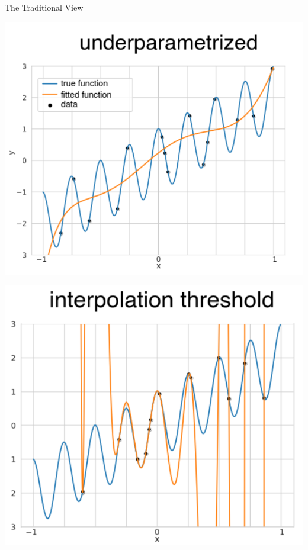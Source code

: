 \documentclass{beamer}
\begin{document}
\begin{frame}{The Traditional View}
    \begin{center}
        \begin{minipage}{0.45\textwidth}
            \centering
            \includegraphics[scale=0.18]{underparam.png}
        \end{minipage}\hfill
        \begin{minipage}{0.45\textwidth}
            \centering
            \includegraphics[scale=0.18]{interpolationth.png}
        \end{minipage}
    \end{center}
\end{frame}
\end{document}
